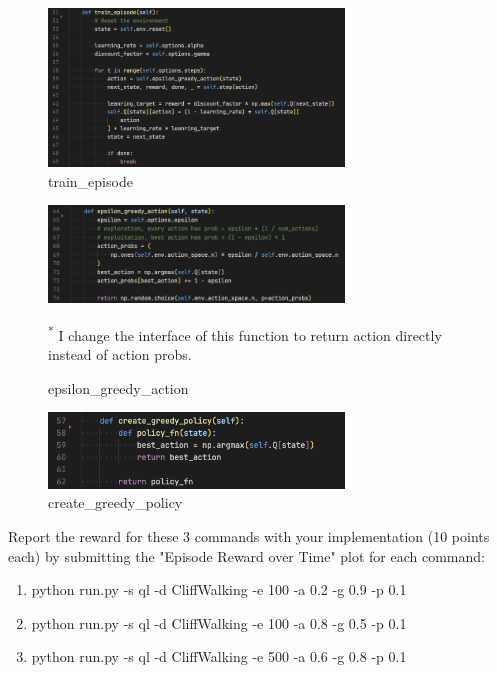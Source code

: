 \documentclass[a4paper]{article}
\theoremstyle{definition}
\newenvironment{soln}{
    \leavevmode\color{blue}\ignorespaces
}{}
\begin{document}
\begin{soln}
	\begin{figure}[H]
		\centering
		\includegraphics[width=0.7\textwidth]{img/ql_train_episode.png}
		\caption*{train\_episode}
	\end{figure}
	\begin{figure}[H]
		\centering
		\includegraphics[width=0.7\textwidth]{img/ql_epsilon_greedy_action.png}
		\caption*{epsilon\_greedy\_action}
    \small\textsuperscript{*} I change the interface of this function to return action directly instead of action probs.
	\end{figure}
	\begin{figure}[H]
		\centering
		\includegraphics[width=0.7\textwidth]{img/ql_create_greedy_policy.png}
		\caption*{create\_greedy\_policy}
	\end{figure}
\end{soln}

Report the reward for these 3 commands with your implementation (10 points each) by submitting the "Episode Reward over Time" plot for each command:

\pagebreak
\begin{enumerate}
	\item  python run.py -s ql -d CliffWalking -e 100 -a 0.2 -g 0.9 -p 0.1
	\item  python run.py -s ql -d CliffWalking -e 100 -a 0.8 -g 0.5 -p 0.1
	\item  python run.py -s ql -d CliffWalking -e 500 -a 0.6 -g 0.8 -p 0.1
\end{enumerate}
\end{document}

